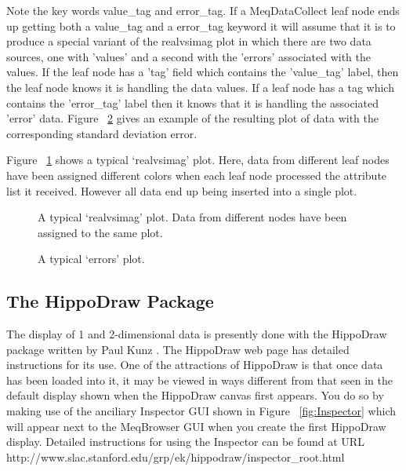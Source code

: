 \documentclass[10pt]{article}
\begin{document}
Note the key words value\_tag and error\_tag.
If a MeqDataCollect leaf node ends up getting both a value\_tag and a error\_tag
keyword it will assume that it is to produce a special variant of
the realvsimag plot in which there are two data sources, one with 'values' and
a second with the 'errors' associated with the values. If the leaf node
has a 'tag' field which contains the 'value\_tag' label, then the
leaf node knows it is handling the data values. If a leaf node has a tag
which contains the 'error\_tag' label then it knows that it is handling
the associated 'error' data. Figure ~\ref{fig:errors} gives an example
of the resulting plot of data with the corresponding standard deviation
error.

Figure ~\ref{fig:realvsimag} shows a typical `realvsimag' plot. Here, data
from different leaf nodes have been assigned different colors when each
leaf node processed the attribute list it received. However all data
end up being inserted into a single plot. 

\begin{figure}
{\par\centering
{}
\par}
\caption {A typical `realvsimag' plot. Data from different nodes have
been assigned to the same plot.}
\label{fig:realvsimag}
\end{figure}

\begin{figure}
{\par\centering
{}
\par}
\caption {A typical `errors' plot. }
\label{fig:errors}
\end{figure}


\subsection {The HippoDraw Package}

The display of 1 and 2-dimensional data is presently done with the
HippoDraw package written by Paul Kunz \cite{kunz}. The HippoDraw web 
page \cite{kunz} has
detailed instructions for its use. One of the attractions 
of HippoDraw is that once data has been loaded into it, it may be 
viewed in ways different from that seen in the default display
shown when the HippoDraw canvas first appears. You do so by making
use of the anciliary Inspector GUI shown in Figure  ~\ref{fig:Inspector} which
will appear next to the MeqBrowser GUI when you create 
the first HippoDraw display. Detailed instructions for using
the Inspector can be found at 
URL http://www.slac.stanford.edu/grp/ek/hippodraw/inspector\_root.html
\end{document}
